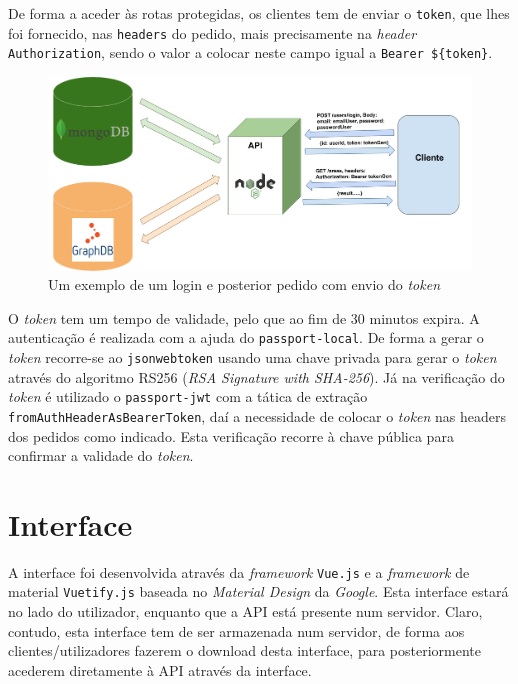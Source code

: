 \documentclass{article}
\begin{document}
De forma a aceder às rotas protegidas, os clientes tem de enviar o \texttt{token}, que lhes foi fornecido, nas \texttt{headers} do pedido, mais precisamente na \textit{header} \texttt{Authorization}, sendo o valor a colocar neste campo igual a \texttt{Bearer \$\{token\}}.

\begin{figure}[H]
    \centering
    \includegraphics[width=15cm]{Pictures/exeAuth.png}
    \caption{Um exemplo de um login e posterior pedido com envio do \textit{token}}
    \label{exe_auth}
\end{figure}

O \textit{token} tem um tempo de validade, pelo que ao fim de 30 minutos expira.
A autenticação é realizada com a ajuda do \texttt{passport-local}. De forma a gerar o \textit{token} recorre-se ao \texttt{jsonwebtoken} usando uma chave privada para gerar o \textit{token} através do algoritmo RS256 (\textit{RSA Signature with SHA-256}). Já na verificação do \textit{token} é utilizado o \texttt{passport-jwt} com a tática de extração \texttt{fromAuthHeaderAsBearerToken}, daí a necessidade de colocar o \textit{token} nas headers dos pedidos como indicado. Esta verificação recorre à chave pública para confirmar a validade do \textit{token}.

\section{Interface}

A interface foi desenvolvida através da \textit{framework} \texttt{Vue.js} e a \textit{framework} de material \texttt{Vuetify.js} baseada no \textit{Material Design} da \textit{Google}. Esta interface estará no lado do utilizador, enquanto que a API está presente num servidor. Claro, contudo, esta interface tem de ser armazenada num servidor, de forma aos clientes/utilizadores fazerem o download desta interface, para posteriormente acederem diretamente à API através da interface.
\end{document}
